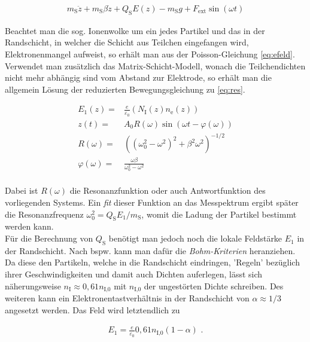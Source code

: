 \documentclass[numbers=noenddot,a4paper,notitlepage,twoside,BCOR15mm]{scrartcl}
\newcommand{\ix}[1]{_\text{#1}}
\newcommand{\tilt}[1]{\textit{#1}}
\begin{document}
			\begin{align}
				m\ix{S}\ddot{z}+m\ix{S}\beta\dot{z}+Q\ix{S}E(z)-m\ix{S}g+F\ix{ext}\sin(\omega t) \label{eq:beweg}
			\end{align}

		Beachtet man die sog. Ionenwolke um ein jedes Partikel und das in der Randschicht, in welcher die Schicht aus Teilchen eingefangen wird, Elektronenmangel aufweist, so erhält man \cite{Melzer94} aus der Poisson-Gleichung \autoref{eq:efeld}. Verwendet man zusätzlich das Matrix-Schicht-Modell, wonach die Teilchendichten nicht mehr abhängig sind vom Abstand zur Elektrode, so erhält man die allgemein Lösung der reduzierten Bewegungsgleichung zu \autoref{eq:res}.

			\begin{align}
				E\ix{1}(z)=&\frac{e}{\varepsilon\ix{0}}(N\ix{I}(z)n\ix{e}(z)) \label{eq:efeld} \\
				z(t)=&A\ix{0}R(\omega)\sin(\omega t-\varphi(\omega)) \label{eq:res}\\
				R(\omega)=&\left((\omega\ix{0}^2-\omega^2)^2+\beta^2\omega^2\right)^{-1/2} \label{eq:antwort} \\
				\varphi(\omega)=&\frac{\omega\beta}{\omega\ix{0}^2-\omega^2} \\
			\end{align}

		Dabei ist $R(\omega)$ die Resonanzfunktion oder auch Antwortfunktion des vorliegenden Systems. Ein \tilt{fit} dieser Funktion an das Messpektrum ergibt später die Resonanzfrequenz $\omega\ix{0}^2=Q\ix{S}E\ix{1}/m\ix{S}$, womit die Ladung der Partikel bestimmt werden kann.\\
		Für die Berechnung von $Q\ix{S}$ benötigt man jedoch noch die lokale Feldstärke $E\ix{1}$ in der Randschicht. Nach bspw. \cite{Piel10} kann man dafür die \tilt{Bohm-Kriterien} heranziehen. Da diese den Partikeln, welche in die Randschicht eindringen, 'Regeln' bezüglich ihrer Geschwindigkeiten und damit auch Dichten auferlegen, lässt sich näherungsweise $n\ix{I}\approx0,61n\ix{I,0}$ mit $n\ix{I,0}$ der ungestörten Dichte schreiben. Des weiteren kann ein Elektronentastverhältnis in der Randschicht von $\alpha\approx1/3$ angesetzt werden. Das Feld wird letztendlich zu

			\begin{align}
				E\ix{1}=\frac{e}{\varepsilon\ix{0}}0,61n\ix{I,0}(1-\alpha) \,\,. \label{eq:konstfeld}
			\end{align}

	\clearpage
\end{document}
